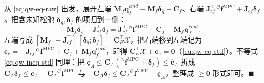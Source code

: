 \begin{derivation}\label{deriv:qw-eq-derive}
从 \cref{eq:qw-eq-raw} 出发，展开左端 $\boldsymbol{M}_f\ddot{\boldsymbol{q}}_f^{cmd}+\boldsymbol{M}_f\boldsymbol{\delta}_{\ddot{q}}+\boldsymbol{C}_f$、右端 $\boldsymbol{J}_{cf}^\top\,{}^{\mathcal{O}}\boldsymbol{f}^{\mathrm{MPC}}+\boldsymbol{J}_{cf}^\top\boldsymbol{\delta}_f$。把含未知松弛 $\boldsymbol{\delta}_{\ddot{q}},\boldsymbol{\delta}_f$ 的项归到一侧：
\[
  \boldsymbol{M}_f\boldsymbol{\delta}_{\ddot{q}}-\boldsymbol{J}_{cf}^\top\boldsymbol{\delta}_f
  =\boldsymbol{J}_{cf}^\top\,{}^{\mathcal{O}}\boldsymbol{f}^{\mathrm{MPC}}-\boldsymbol{C}_f-\boldsymbol{M}_f\ddot{\boldsymbol{q}}_f^{cmd}.
\]
左端写成 $[\boldsymbol{M}_f\ \ -\boldsymbol{J}_{cf}^\top]\,[\boldsymbol{\delta}_{\ddot{q}};\boldsymbol{\delta}_f]=\boldsymbol{C}_E^\top\boldsymbol{\mathcal{X}}$，把右端移到左端记为 $\boldsymbol{c}_e=-\boldsymbol{J}_{cf}^\top\,{}^{\mathcal{O}}\boldsymbol{f}^{\mathrm{MPC}}+\boldsymbol{C}_f+\boldsymbol{M}_f\ddot{\boldsymbol{q}}_f^{cmd}$，即得 $\boldsymbol{C}_E^\top\boldsymbol{\mathcal{X}}+\boldsymbol{c}_e=\mathbf{0}$（\cref{eq:qw-eq-std}）。不等式 \cref{eq:qw-ineq-std} 同理：把 $\underline{\boldsymbol{c}}_A\le\boldsymbol{C}_A({}^{\mathcal{O}}\boldsymbol{f}^{\mathrm{MPC}}+\boldsymbol{\delta}_f)\le\overline{\boldsymbol{c}}_A$ 拆成 $\boldsymbol{C}_A\boldsymbol{\delta}_f\le\overline{\boldsymbol{c}}_A-\boldsymbol{C}_A{}^{\mathcal{O}}\boldsymbol{f}^{\mathrm{MPC}}$ 与 $-\boldsymbol{C}_A\boldsymbol{\delta}_f\le\boldsymbol{C}_A{}^{\mathcal{O}}\boldsymbol{f}^{\mathrm{MPC}}-\underline{\boldsymbol{c}}_A$，整理成 $\ge\mathbf{0}$ 形式即可。$\blacksquare$
\end{derivation}
